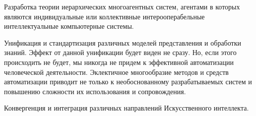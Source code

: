 \begin{textitemize}
	\item Разработка теории иерархических многоагентных систем, агентами в которых являются индивидуальные или коллективные интерооперабельные интеллектуальные компьютерные системы.
	\item Унификация и стандартизация различных моделей представления и обработки знаний. Эффект от данной унификации будет виден не сразу. Но, если этого происходить не будет, мы никогда не придем к эффективной  автоматизации человеческой деятельности. Эклектичное многообразие методов и средств автоматизации приводит не только к необоснованному  разрабатываемых систем и повышению сложности их использования и сопровождения.
	\item Конвергенция и интеграция различных направлений Искусственного интеллекта.
	

\end{textitemize}
